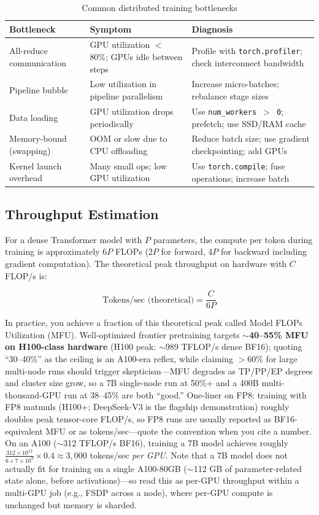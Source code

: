 \begin{table}[H]
\centering
\caption{Common distributed training bottlenecks}
\begin{tabularx}{\textwidth}{lXX}
\toprule
\textbf{Bottleneck} & \textbf{Symptom} & \textbf{Diagnosis} \\
\midrule
All-reduce communication & GPU utilization $<$ 80\%; GPUs idle between steps & Profile with \texttt{torch.profiler}; check interconnect bandwidth \\
Pipeline bubble & Low utilization in pipeline parallelism & Increase micro-batches; rebalance stage sizes \\
Data loading & GPU utilization drops periodically & Use \texttt{num\_workers $>$ 0}; prefetch; use SSD/RAM cache \\
Memory-bound (swapping) & OOM or slow due to CPU offloading & Reduce batch size; use gradient checkpointing; add GPUs \\
Kernel launch overhead & Many small ops; low GPU utilization & Use \texttt{torch.compile}; fuse operations; increase batch \\
\bottomrule
\end{tabularx}
\end{table}

\subsection{Throughput Estimation}

For a dense Transformer model with $P$ parameters, the compute per token during training is approximately $6P$ FLOPs (2$P$ for forward, 4$P$ for backward including gradient computation). The theoretical peak throughput on hardware with $C$ FLOP/s is:

\begin{equation}
\text{Tokens/sec (theoretical)} = \frac{C}{6P}
\end{equation}

In practice, you achieve a fraction of this theoretical peak called Model FLOPs Utilization (MFU). Well-optimized frontier pretraining targets \textbf{$\sim$40--55\% MFU on H100-class hardware} (H100 peak: $\sim$989 TFLOP/s dense BF16); quoting ``30--40\%'' as the ceiling is an A100-era reflex, while claiming $>$60\% for large multi-node runs should trigger skepticism---MFU degrades as TP/PP/EP degrees and cluster size grow, so a 7B single-node run at 50\%+ and a 400B multi-thousand-GPU run at 38--45\% are both ``good.'' One-liner on FP8: training with FP8 matmuls (H100+; DeepSeek-V3 is the flagship demonstration) roughly doubles peak tensor-core FLOP/s, so FP8 runs are usually reported as BF16-equivalent MFU or as tokens/sec---quote the convention when you cite a number. On an A100 ($\sim$312 TFLOP/s BF16), training a 7B model achieves roughly $\frac{312 \times 10^{12}}{6 \times 7 \times 10^9} \times 0.4 \approx 3{,}000$ tokens/sec \textit{per GPU}. Note that a 7B model does not actually fit for training on a single A100-80GB ($\sim$112 GB of parameter-related state alone, before activations)---so read this as per-GPU throughput within a multi-GPU job (e.g., FSDP across a node), where per-GPU compute is unchanged but memory is sharded.

